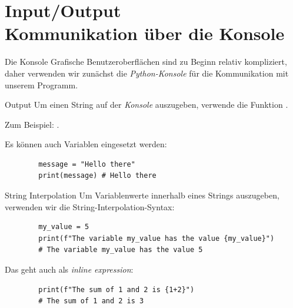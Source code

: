\section{Input/Output \\ \footnotesize Kommunikation über die Konsole}


\begin{frame}

\begin{block}{Die Konsole}
\vspace{2pt}
Grafische Benutzeroberflächen sind zu Beginn relativ kompliziert, daher verwenden wir zunächst die \emph{Python-Konsole} für die Kommunikation mit unserem Programm. 
\end{block}

\end{frame}

\begin{fragile}[]
	
	\begin{block}{Output}
		\vspace{2pt}
		Um einen String auf der \emph{Konsole} auszugeben, verwende die Funktion . 
		
		
		Zum Beispiel: . 
		\pause
		
		\vspace{12pt}
		
		Es können auch Variablen eingesetzt werden: 
		\begin{verbatim}
		message = "Hello there"
		print(message) # Hello there
		\end{verbatim}
		
	\end{block}
	
\end{fragile}

\begin{fragile}[]
	
	\begin{block}{String Interpolation}
		\vspace{2pt}
		Um Variablenwerte innerhalb eines Strings auszugeben, verwenden wir die String-Interpolation-Syntax:
		\begin{verbatim}
		my_value = 5
		print(f"The variable my_value has the value {my_value}")
		# The variable my_value has the value 5
		\end{verbatim}
		
		\pause
		
		\vspace{12pt}
		
		Das geht auch als \textit{inline expression}: 
		\begin{verbatim}
		print(f"The sum of 1 and 2 is {1+2}")
		# The sum of 1 and 2 is 3
		\end{verbatim}
		
	\end{block}
	
\end{fragile}

